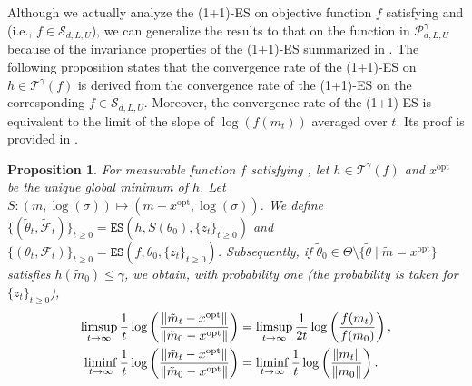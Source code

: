 \documentclass[journal]{IEEEtran}
\providecommand{\limsup}{\operatornamewithlimits{limsup}} %
\providecommand{\liminf}{\operatornamewithlimits{liminf}} %
\renewcommand{\geq}{\geqslant} %
\renewcommand{\leq}{\leqslant} %
\DeclarePairedDelimiter{\norm}{\lVert}{\rVert}
\newtheorem{proposition}[theorem]{Proposition}
\theoremstyle{definition}
\begin{document}
Although we actually analyze the (1+1)-ES on objective function $f$ satisfying  and  (i.e., $f \in \mathcal{S}_{d, L, U}$), we can generalize the results to that on the function in $\mathcal{P}_{d, L, U}^{\gamma}$ because of the invariance properties of the (1+1)-ES summarized in .
The following proposition states that the convergence rate of the (1+1)-ES on $h \in \mathcal{T}^{\gamma}(f)$ is derived from the convergence rate of the (1+1)-ES on the corresponding $f \in \mathcal{S}_{d,L,U}$. Moreover, the convergence rate of the (1+1)-ES is equivalent to the limit of the slope of $\log(f(m_t))$ averaged over $t$.
Its proof is provided in .
\begin{proposition}\label{prop:f-norm}
For measurable function $f$ satisfying , let $h \in \mathcal{T}^{\gamma}(f)$ and $x^\mathrm{opt}$ be the unique global minimum of $h$.
Let
$S: (m, \log(\sigma)) \mapsto (m + x^\mathrm{opt}, \log(\sigma))$.
We define $\{(\tilde{\theta}_t, \tilde{\mathcal{F}}_{t})\}_{t\geq 0} = \texttt{ES}(h, S(\theta_0), \{z_t\}_{t \geq 0})$ and $\{(\theta_t, \mathcal{F}_{t})\}_{t\geq 0} = \texttt{ES}(f, \theta_0, \{z_t\}_{t \geq 0})$.
Subsequently,  
if $\tilde{\theta}_0 \in \Theta\setminus\{\tilde{\theta}\mid \tilde{m}= x^\mathrm{opt}\}$ satisfies $h(\tilde{m}_0) \leq \gamma$,
we obtain, with probability one (the probability is taken for $\{z_t\}_{t \geq 0}$), 
\begin{align}
\limsup_{t \to \infty} \frac{1}{t} \log \left( \frac{\norm{ \tilde{m}_t - x^\mathrm{opt} }}{\norm{\tilde{m}_0 - x^\mathrm{opt}}} \right)
&=
\limsup_{t \to \infty} \frac{1}{2t} \log \left( \frac{f(m_t)}{f(m_0)} \right)
,
\label{eq:limsup}
\\
\liminf_{t \to \infty} \frac{1}{t} \log \left( \frac{\norm{ \tilde{m}_t - x^\mathrm{opt} }}{\norm{\tilde{m}_0 - x^\mathrm{opt}}} \right)
&=
\liminf_{t \to \infty} \frac{1}{t} \log \left( \frac{\norm{m_t} }{\norm{m_0}} \right)
\label{eq:liminf}
.
\end{align}
\end{proposition}
\end{document}
